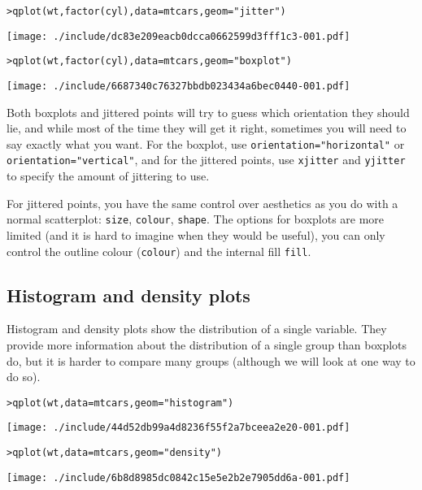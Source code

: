 \begin{alltt}
> qplot(wt, factor(cyl), data = mtcars, geom = "jitter")
\end{alltt}
\texttt{[image: ./include/dc83e209eacb0dcca0662599d3fff1c3-001.pdf]}
\begin{alltt}

> qplot(wt, factor(cyl), data = mtcars, geom = "boxplot")
\end{alltt}
\texttt{[image: ./include/6687340c76327bbdb023434a6bec0440-001.pdf]}
\begin{alltt}

\end{alltt}

Both boxplots and jittered points will try to guess which orientation they should lie, and while most of the time they will get it right, sometimes you will need to say exactly what you want.  For the boxplot, use {\tt orientation="horizontal"} or {\tt orientation="vertical"}, and for the jittered points, use {\tt xjitter} and {\tt yjitter} to specify the amount of jittering to use. 

For jittered points, you have the same control over aesthetics as you do with a normal scatterplot: {\tt size}, {\tt colour}, {\tt shape}.  The options for boxplots are more limited (and it is hard to imagine when they would be useful), you can only control the outline colour ({\tt colour}) and the internal fill {\tt fill}.

\subsection{Histogram and density plots}\label{sub:density}

Histogram and density plots show the distribution of a single variable.  They provide more information about the distribution of a single group than boxplots do, but it is harder to compare many groups (although we will look at one way to do so).

\begin{alltt}
> qplot(wt, data = mtcars, geom = "histogram")
\end{alltt}
\texttt{[image: ./include/44d52db99a4d8236f55f2a7bceea2e20-001.pdf]}
\begin{alltt}

> qplot(wt, data = mtcars, geom = "density")
\end{alltt}
\texttt{[image: ./include/6b8d8985dc0842c15e5e2b2e7905dd6a-001.pdf]}
\begin{alltt}

\end{alltt}

